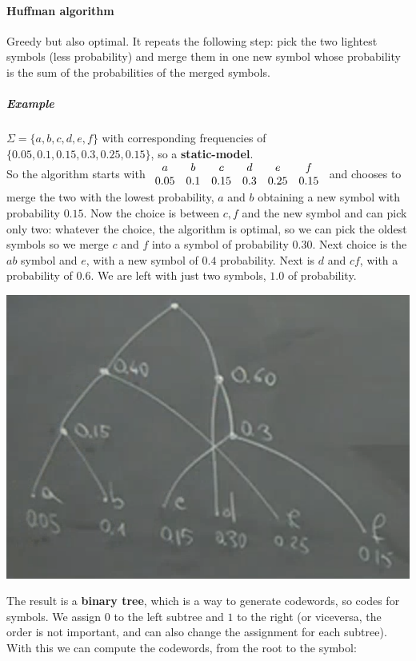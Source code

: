 \documentclass[10pt]{report}
\begin{document}
\paragraph{Huffman algorithm} Greedy but also optimal. It repeats the following step: pick the two lightest symbols (less probability) and merge them in one new symbol whose probability is the sum of the probabilities of the merged symbols.
\subparagraph{Example} $\Sigma=\{a,b,c,d,e,f\}$ with corresponding frequencies of $\{0.05, 0.1, 0.15, 0.3, 0.25, 0.15\}$, so a \textbf{static-model}.\\
So the algorithm starts with $\begin{array}{c c c c c c}
a&b&c&d&e&f\\
0.05&0.1&0.15&0.3&0.25&0.15
\end{array}$ and chooses to merge the two with the lowest probability, $a$ and $b$ obtaining a new symbol with probability $0.15$. Now the choice is between $c,f$ and the new symbol and can pick only two: whatever the choice, the algorithm is optimal, so we can pick the oldest symbols so we merge $c$ and $f$ into a symbol of probability $0.30$. Next choice is the $ab$ symbol and $e$, with a new symbol of $0.4$ probability. Next is $d$ and $cf$, with a probability of $0.6$. We are left with just two symbols, $1.0$ of probability.
\begin{center}
	\includegraphics[scale=0.5]{17.png}
\end{center}
The result is a \textbf{binary tree}, which is a way to generate codewords, so codes for symbols. We assign $0$ to the left subtree and $1$ to the right (or viceversa, the order is not important, and can also change the assignment for each subtree). With this we can compute the codewords, from the root to the symbol:
\end{document}
